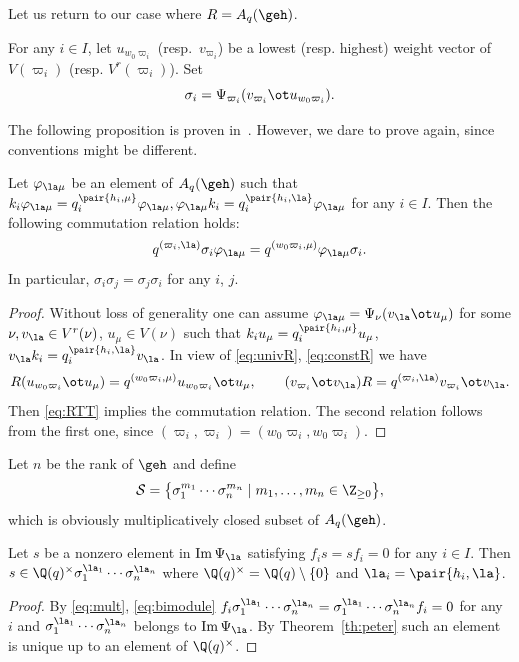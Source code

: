 Let us return to our case where $R=A_q(\geh)$.
%
\begin{definition}\label{def:sigma}
For any $i \in I$, let $u_{w_0\varpi_i}$ (resp.~$v_{\varpi_i}$) be a lowest (resp. highest) weight vector
of $V(\varpi_i)$ (resp. $V^r(\varpi_i)$). Set
\[
\sigma_i=\Psi_{\varpi_i}(v_{\varpi_i}\ot u_{w_0\varpi_i}).
\]
\end{definition}

The following proposition is proven in~\cite{Joseph}. However, we dare to prove again, since conventions
might be dif\/ferent.

\begin{proposition} \label{pr:q-comm}
Let $\varphi_{\la\mu}$ be an element of $A_q(\geh)$ such that $k_i\varphi_{\la\mu}=
q_i^{\pair{h_i,\mu}}\varphi_{\la\mu},\varphi_{\la\mu}k_i=q_i^{\pair{h_i,\la}}\varphi_{\la\mu}$
for any $i \in I$. Then the following commutation relation holds:
\[
q^{(\varpi_i,\la)}\sigma_i\varphi_{\la\mu}=q^{(w_0\varpi_i,\mu)}\varphi_{\la\mu}\sigma_i.
\]
In particular, $\sigma_i\sigma_j=\sigma_j\sigma_i$ for any $i$, $j$.
\end{proposition}

\begin{proof}
Without loss of generality one can assume $\varphi_{\la\mu}=\Psi_\nu(v_\la\ot u_\mu)$ for some
$\nu,v_\la\in V^r(\nu)$, $u_\mu\in V(\nu)$ such that $k_iu_\mu=q_i^{\pair{h_i,\mu}}u_\mu$,
$v_\la k_i=q_i^{\pair{h_i,\la}}v_\la$. In view of \eqref{eq:univR}, \eqref{eq:constR} we have
\[
R(u_{w_0\varpi_i}\ot u_\mu)=q^{(w_0\varpi_i,\mu)}u_{w_0\varpi_i}\ot u_\mu,\qquad
(v_{\varpi_i}\ot v_\la)R=q^{(\varpi_i,\la)}v_{\varpi_i}\ot v_\la.
\]
Then \eqref{eq:RTT} implies the commutation relation.
The second relation follows from the f\/irst one, since $(\varpi_i,\varpi_i)
=(w_0\varpi_i,w_0\varpi_i)$.
\end{proof}

Let $n$ be the rank of $\geh$ and def\/ine
\begin{gather*}
\mathcal{S}=\big\{\sigma_1^{m_1}\cdots\sigma_n^{m_n}\mid m_1,\ldots,m_n\in\Z_{\ge0}\big\},
\end{gather*}
which is obviously multiplicatively closed subset of $A_q(\geh)$.

\begin{lemma}\label{le:ff}
Let $s$ be a nonzero element in $\mathrm{Im}\,\Psi_\la$
satisfying $f_is=sf_i=0$ for any $i \in I$.
Then $s\in\Q(q)^\times\sigma_1^{\la_1}\cdots\sigma_n^{\la_n}$
where $\Q(q)^\times=\Q(q)\setminus\{0\}$ and
$\la_i=\pair{h_i,\la}$.
\end{lemma}
%
\begin{proof}
By \eqref{eq:mult}, \eqref{eq:bimodule} $f_i\sigma_1^{\la_1}\cdots\sigma_n^{\la_n}
=\sigma_1^{\la_1}\cdots\sigma_n^{\la_n}f_i=0$ for any $i$ and $\sigma_1^{\la_1}\cdots\sigma_n^{\la_n}$
belongs to $\mathrm{Im}\,\Psi_\la$. By Theorem~\ref{th:peter} such an element is unique up to an element
of $\Q(q)^\times$.
\end{proof}

